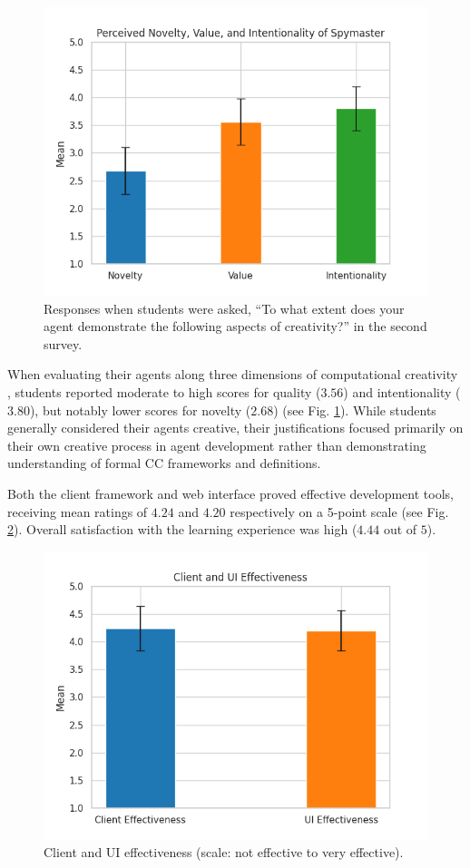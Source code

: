 \documentclass[phd,electronic,oneside,twosidetoc,letterpaper,chaptercenter,parttop,lof]{byumsphd}
\begin{document}
\begin{figure}[tb]
    \centering
    \includegraphics[width=.75\linewidth]{images/codenames/novelty_value_intentionality.png}
    \caption[Novelty, value, intentionality]{Responses when students were asked, “To what extent does your agent demonstrate the following aspects of creativity?” in the second survey. 
}
    \label{fig:novelty_value_intentionality}
\end{figure}

When evaluating their agents along three dimensions of computational creativity \cite{ventura2017howto}, students reported moderate to high scores for quality ($3.56$) and intentionality ($3.80$), but notably lower scores for novelty ($2.68$) (see Fig. \ref{fig:novelty_value_intentionality}). While students generally considered their agents creative, their justifications focused primarily on their own creative process in agent development rather than demonstrating understanding of formal CC frameworks and definitions.


Both the client framework and web interface proved effective development tools, receiving mean ratings of $4.24$ and $4.20$ respectively on a 5-point scale (see Fig. \ref{fig:code_ui_effectiveness}). Overall satisfaction with the learning experience was high ($4.44$ out of $5$). 

\begin{figure}[tb]
    \centering
    \includegraphics[width=.75\linewidth]{images/codenames/code_ui_effectiveness.png}
    \caption[Code and UI effectiveness]{Client and UI effectiveness (scale: not effective to very effective).}
    \label{fig:code_ui_effectiveness}
\end{figure}
\end{document}
